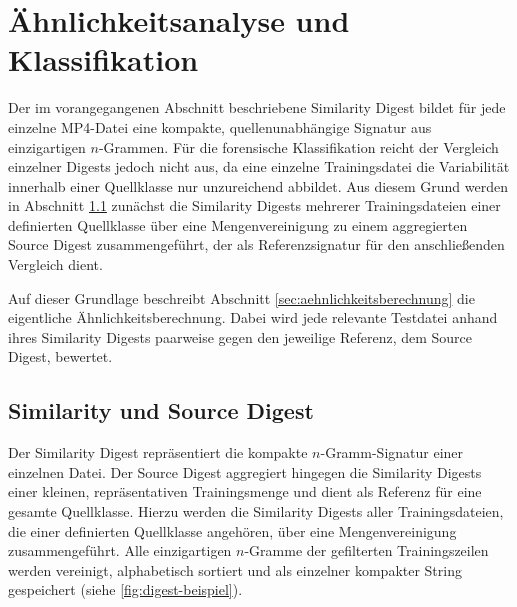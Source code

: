 \section{Ähnlichkeitsanalyse und Klassifikation}
\label{sec:aehnlichkeit}

Der im vorangegangenen Abschnitt beschriebene Similarity Digest bildet für jede einzelne MP4-Datei eine kompakte, quellenunabhängige Signatur aus einzigartigen \(n\)-Grammen. Für die forensische Klassifikation reicht der Vergleich einzelner Digests jedoch nicht aus, da eine einzelne Trainingsdatei die Variabilität innerhalb einer Quellklasse nur unzureichend abbildet. Aus diesem Grund werden in Abschnitt \ref{sec:sourcedigest} zunächst die Similarity Digests mehrerer Trainingsdateien einer definierten Quellklasse über eine Mengenvereinigung zu einem aggregierten Source Digest zusammengeführt, der als Referenzsignatur für den anschließenden Vergleich dient.

Auf dieser Grundlage beschreibt Abschnitt \ref{sec:aehnlichkeitsberechnung} die eigentliche Ähnlichkeitsberechnung. Dabei wird jede relevante Testdatei anhand ihres Similarity Digests paarweise gegen den jeweilige Referenz, dem Source Digest, bewertet.


\subsection{Similarity und Source Digest}
\label{sec:sourcedigest}

Der Similarity Digest repräsentiert die kompakte \(n\)-Gramm-Signatur einer einzelnen Datei. Der Source Digest aggregiert hingegen die Similarity Digests einer kleinen, repräsentativen Trainingsmenge und dient als Referenz für eine gesamte Quellklasse. Hierzu werden die Similarity Digests aller Trainingsdateien, die einer definierten Quellklasse angehören, über eine Mengenvereinigung zusammengeführt. Alle einzigartigen \(n\)-Gramme der gefilterten Trainingszeilen werden vereinigt, alphabetisch sortiert und als einzelner kompakter String gespeichert (siehe \cref{fig:digest-beispiel}).\\

